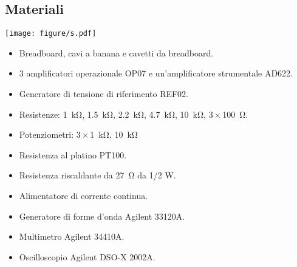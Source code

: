 \subsection{Materiali}

\begin{sidewaysfigure*}
	\texttt{[image: figure/s.pdf]}
    \caption{}
    \label{fig:circ6}
\end{sidewaysfigure*}

\begin{itemize}
    \item{Breadboard, cavi a banana e cavetti da breadboard.}
    \item{3 amplificatori operazionale OP07 e un'amplificatore strumentale AD622.}
    \item{Generatore di tensione di riferimento REF02.}
    \item{Resistenze: \SI{1}{\kilo\ohm}, \SI{1.5}{\kilo\ohm}, \SI{2.2}{\kilo\ohm}, \SI{4.7}{\kilo\ohm}, \SI{10}{\kilo\ohm}, $3 \times$\SI{100}{\ohm}.}
    \item{Potenziometri: $3 \times$\SI{1}{\kilo\ohm}, \SI{10}{\kilo\ohm}}
    \item{Resistenza al platino PT100.}
    \item{Resistenza riscaldante da \SI{27}{\ohm} da 1/2 W.}
    \item{Alimentatore di corrente continua.}
    \item{Generatore di forme d'onda Agilent 33120A.}
    \item{Multimetro Agilent 34410A.}
    \item{Oscilloscopio Agilent DSO-X 2002A.}
\end{itemize}

